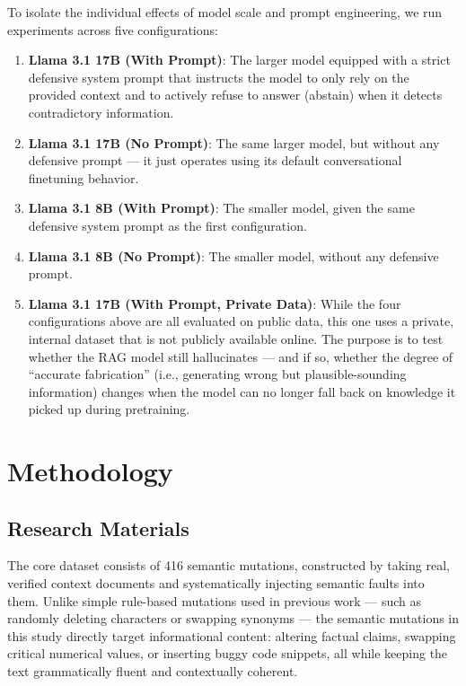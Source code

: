 \documentclass[
    a4paper,
    man,
    floatsintext
]{glossaPX2}
\begin{document}
To isolate the individual effects of model scale and prompt engineering, we run experiments across five configurations:

\begin{enumerate}
\item \textbf{Llama 3.1 17B (With Prompt)}: The larger model equipped with a strict defensive system prompt that instructs the model to only rely on the provided context and to actively refuse to answer (abstain) when it detects contradictory information.
\item \textbf{Llama 3.1 17B (No Prompt)}: The same larger model, but without any defensive prompt --- it just operates using its default conversational finetuning behavior.
\item \textbf{Llama 3.1 8B (With Prompt)}: The smaller model, given the same defensive system prompt as the first configuration.
\item \textbf{Llama 3.1 8B (No Prompt)}: The smaller model, without any defensive prompt.
\item \textbf{Llama 3.1 17B (With Prompt, Private Data)}: While the four configurations above are all evaluated on public data, this one uses a private, internal dataset that is not publicly available online. The purpose is to test whether the RAG model still hallucinates --- and if so, whether the degree of ``accurate fabrication'' (i.e., generating wrong but plausible-sounding information) changes when the model can no longer fall back on knowledge it picked up during pretraining.
\end{enumerate}

\section{Methodology}

\subsection{Research Materials}
The core dataset consists of 416 semantic mutations, constructed by taking real, verified context documents and systematically injecting semantic faults into them. Unlike simple rule-based mutations used in previous work --- such as randomly deleting characters or swapping synonyms --- the semantic mutations in this study directly target informational content: altering factual claims, swapping critical numerical values, or inserting buggy code snippets, all while keeping the text grammatically fluent and contextually coherent.
\end{document}
